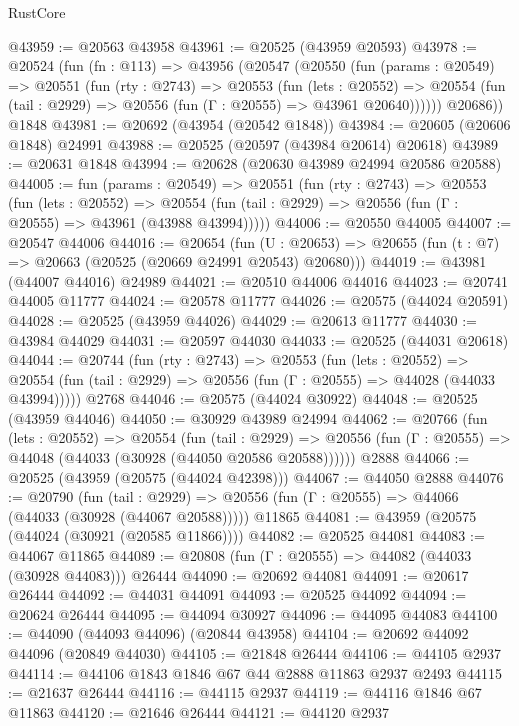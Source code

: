 \begin{lexlean}{RustCore}
\begin{coremodule}
@43959 := @20563 @43958
@43961 := @20525 (@43959 @20593)
@43978 := @20524
    (fun (fn : @113) =>
    @43956
      (@20547
        (@20550
          (fun (params : @20549) =>
          @20551
            (fun (rty : @2743) =>
            @20553
              (fun (lets : @20552) =>
              @20554 (fun (tail : @2929) => @20556 (fun (Γ : @20555) => @43961 @20640))))))
        @20686))
    @1848
@43981 := @20692 (@43954 (@20542 @1848))
@43984 := @20605 (@20606 @1848) @24991
@43988 := @20525 (@20597 (@43984 @20614) @20618)
@43989 := @20631 @1848
@43994 := @20628 (@20630 @43989 @24994 @20586 @20588)
@44005 := fun (params : @20549) =>
  @20551
    (fun (rty : @2743) =>
    @20553
      (fun (lets : @20552) =>
      @20554 (fun (tail : @2929) => @20556 (fun (Γ : @20555) => @43961 (@43988 @43994)))))
@44006 := @20550 @44005
@44007 := @20547 @44006
@44016 := @20654
    (fun (U : @20653) => @20655 (fun (t : @7) => @20663 (@20525 (@20669 @24991 @20543) @20680)))
@44019 := @43981 (@44007 @44016) @24989
@44021 := @20510 @44006 @44016
@44023 := @20741 @44005 @11777
@44024 := @20578 @11777
@44026 := @20575 (@44024 @20591)
@44028 := @20525 (@43959 @44026)
@44029 := @20613 @11777
@44030 := @43984 @44029
@44031 := @20597 @44030
@44033 := @20525 (@44031 @20618)
@44044 := @20744
    (fun (rty : @2743) =>
    @20553
      (fun (lets : @20552) =>
      @20554 (fun (tail : @2929) => @20556 (fun (Γ : @20555) => @44028 (@44033 @43994)))))
    @2768
@44046 := @20575 (@44024 @30922)
@44048 := @20525 (@43959 @44046)
@44050 := @30929 @43989 @24994
@44062 := @20766
    (fun (lets : @20552) =>
    @20554
      (fun (tail : @2929) =>
      @20556 (fun (Γ : @20555) => @44048 (@44033 (@30928 (@44050 @20586 @20588))))))
    @2888
@44066 := @20525 (@43959 (@20575 (@44024 @42398)))
@44067 := @44050 @2888
@44076 := @20790
    (fun (tail : @2929) => @20556 (fun (Γ : @20555) => @44066 (@44033 (@30928 (@44067 @20588)))))
    @11865
@44081 := @43959 (@20575 (@44024 (@30921 (@20585 @11866))))
@44082 := @20525 @44081
@44083 := @44067 @11865
@44089 := @20808 (fun (Γ : @20555) => @44082 (@44033 (@30928 @44083))) @26444
@44090 := @20692 @44081
@44091 := @20617 @26444
@44092 := @44031 @44091
@44093 := @20525 @44092
@44094 := @20624 @26444
@44095 := @44094 @30927
@44096 := @44095 @44083
@44100 := @44090 (@44093 @44096) (@20844 @43958)
@44104 := @20692 @44092 @44096 (@20849 @44030)
@44105 := @21848 @26444
@44106 := @44105 @2937
@44114 := @44106 @1843 @1846 @67 @44 @2888 @11863 @2937 @2493
@44115 := @21637 @26444
@44116 := @44115 @2937
@44119 := @44116 @1846 @67 @11863
@44120 := @21646 @26444
@44121 := @44120 @2937

\end{coremodule}
\end{lexlean}
